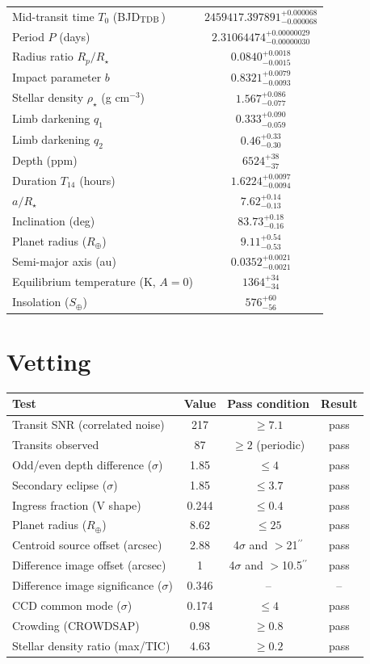 \documentclass[11pt,a4paper]{article}
\newcommand{\arcsec}{$^{\prime\prime}$}
\begin{document}
\begin{tabular}{lc}\toprule
Mid-transit time $T_0$ (BJD$_{\rm TDB}$) & $2459417.397891^{+0.000068}_{-0.000068}$ \\
Period $P$ (days) & $2.31064474^{+0.00000029}_{-0.00000030}$ \\
Radius ratio $R_p/R_\star$ & $0.0840^{+0.0018}_{-0.0015}$ \\
Impact parameter $b$ & $0.8321^{+0.0079}_{-0.0093}$ \\
Stellar density $\rho_\star$ (g cm$^{-3}$) & $1.567^{+0.086}_{-0.077}$ \\
Limb darkening $q_1$ & $0.333^{+0.090}_{-0.059}$ \\
Limb darkening $q_2$ & $0.46^{+0.33}_{-0.30}$ \\
Depth (ppm) & $6524^{+38}_{-37}$ \\
Duration $T_{14}$ (hours) & $1.6224^{+0.0097}_{-0.0094}$ \\
$a/R_\star$ & $7.62^{+0.14}_{-0.13}$ \\
Inclination (deg) & $83.73^{+0.18}_{-0.16}$ \\
Planet radius ($R_\oplus$) & $9.11^{+0.54}_{-0.53}$ \\
Semi-major axis (au) & $0.0352^{+0.0021}_{-0.0021}$ \\
Equilibrium temperature (K, $A=0$) & $1364^{+34}_{-34}$ \\
Insolation ($S_\oplus$) & $576^{+60}_{-56}$ \\
\bottomrule\end{tabular}

\section*{Vetting}
\begin{tabular}{lccc}\toprule
Test & Value & Pass condition & Result \\\midrule
Transit SNR (correlated noise) & 217 & $\ge 7.1$ & pass \\
Transits observed & 87 & $\ge 2$ (periodic) & pass \\
Odd/even depth difference ($\sigma$) & 1.85 & $\le 4$ & pass \\
Secondary eclipse ($\sigma$) & 1.85 & $\le 3.7$ & pass \\
Ingress fraction (V shape) & 0.244 & $\le 0.4$ & pass \\
Planet radius ($R_\oplus$) & 8.62 & $\le 25$ & pass \\
Centroid source offset (arcsec) & 2.88 & 4$\sigma$ and $>$21\arcsec & pass \\
Difference image offset (arcsec) & 1 & 4$\sigma$ and $>$10.5\arcsec & pass \\
Difference image significance ($\sigma$) & 0.346 & -- & -- \\
CCD common mode ($\sigma$) & 0.174 & $\le 4$ & pass \\
Crowding (CROWDSAP) & 0.98 & $\ge 0.8$ & pass \\
Stellar density ratio (max/TIC) & 4.63 & $\ge 0.2$ & pass \\
\bottomrule\end{tabular}
\end{document}
